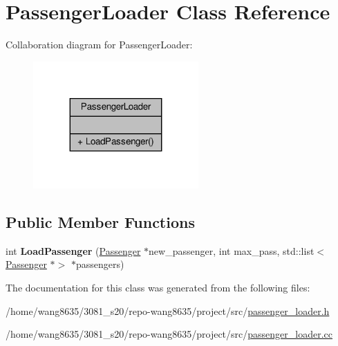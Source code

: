 \hypertarget{classPassengerLoader}{}\section{Passenger\+Loader Class Reference}
\label{classPassengerLoader}


Collaboration diagram for Passenger\+Loader\+:\nopagebreak
\begin{figure}[H]
\begin{center}
\leavevmode
\includegraphics[width=179pt]{classPassengerLoader__coll__graph}
\end{center}
\end{figure}
\subsection*{Public Member Functions}
\begin{DoxyCompactItemize}
\item 
\mbox{\label{classPassengerLoader_a804ae6e894dd35dd6984dfd3b9b06b34}} 
int {\bfseries Load\+Passenger} (\hyperlink{classPassenger}{Passenger} $\ast$new\+\_\+passenger, int max\+\_\+pass, std\+::list$<$ \hyperlink{classPassenger}{Passenger} $\ast$$>$ $\ast$passengers)
\end{DoxyCompactItemize}


The documentation for this class was generated from the following files\+:\begin{DoxyCompactItemize}
\item 
/home/wang8635/3081\+\_\+s20/repo-\/wang8635/project/src/\hyperlink{passenger__loader_8h}{passenger\+\_\+loader.\+h}\item 
/home/wang8635/3081\+\_\+s20/repo-\/wang8635/project/src/\hyperlink{passenger__loader_8cc}{passenger\+\_\+loader.\+cc}\end{DoxyCompactItemize}

